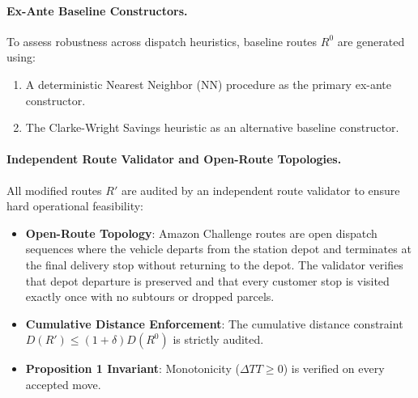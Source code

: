 \documentclass[11pt,a4paper]{article}
\begin{document}
\paragraph{Ex-Ante Baseline Constructors.}
To assess robustness across dispatch heuristics, baseline routes $R^0$ are generated using:
\begin{enumerate}
    \item A deterministic Nearest Neighbor (NN) procedure as the primary ex-ante constructor.
    \item The Clarke-Wright Savings heuristic as an alternative baseline constructor.
\end{enumerate}

\paragraph{Independent Route Validator and Open-Route Topologies.}
All modified routes $R'$ are audited by an independent route validator to ensure hard operational feasibility:
\begin{itemize}
    \item \textbf{Open-Route Topology}: Amazon Challenge routes are open dispatch sequences where the vehicle departs from the station depot and terminates at the final delivery stop without returning to the depot. The validator verifies that depot departure is preserved and that every customer stop is visited exactly once with no subtours or dropped parcels.
    \item \textbf{Cumulative Distance Enforcement}: The cumulative distance constraint $D(R') \le (1+\delta)D(R^0)$ is strictly audited.
    \item \textbf{Proposition 1 Invariant}: Monotonicity ($\Delta TT \ge 0$) is verified on every accepted move.
\end{itemize}
\end{document}

